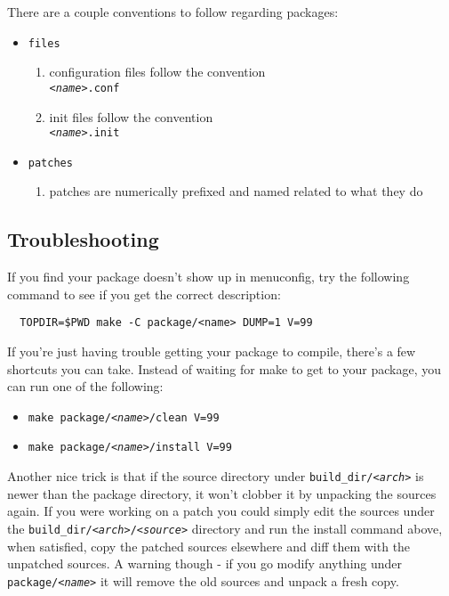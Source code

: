 There are a couple conventions to follow regarding packages:

\begin{itemize}
    \item \texttt{files}
    \begin{enumerate}
        \item configuration files follow the convention \\
        \texttt{\textit{<name>}.conf}
        \item init files follow the convention \\
        \texttt{\textit{<name>}.init}
    \end{enumerate}
    \item \texttt{patches}
    \begin{enumerate}
        \item patches are numerically prefixed and named related to what they do
    \end{enumerate}
\end{itemize}

\subsection{Troubleshooting}

If you find your package doesn't show up in menuconfig, try the following command to
see if you get the correct description:

\begin{Verbatim}
  TOPDIR=$PWD make -C package/<name> DUMP=1 V=99
\end{Verbatim}

If you're just having trouble getting your package to compile, there's a few
shortcuts you can take. Instead of waiting for make to get to your package, you can
run one of the following:

\begin{itemize}
    \item \texttt{make package/\textit{<name>}/clean V=99}
    \item \texttt{make package/\textit{<name>}/install V=99}
\end{itemize}

Another nice trick is that if the source directory under \texttt{build\_dir/\textit{<arch>}}
is newer than the package directory, it won't clobber it by unpacking the sources again.
If you were working on a patch you could simply edit the sources under the
\texttt{build\_dir/\textit{<arch>}/\textit{<source>}} directory and run the install command above,
when satisfied, copy the patched sources elsewhere and diff them with the unpatched
sources. A warning though - if you go modify anything under \texttt{package/\textit{<name>}}
it will remove the old sources and unpack a fresh copy.

